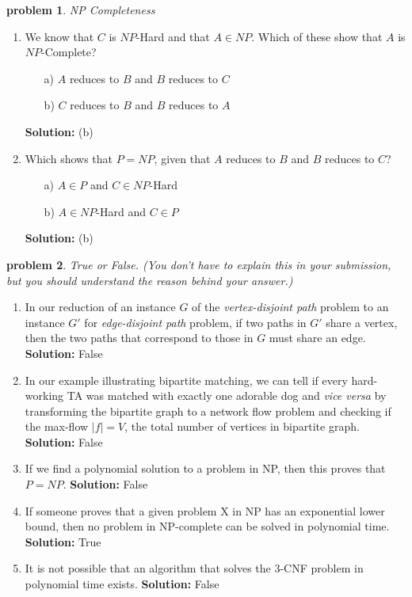 \documentclass[10pt]{article}
\newcommand{\solution}[1]{\color{blue}\hfill\break\noindent\textbf{Solution:} #1\color{black}}
\newtheorem{problem}{\sc\color{cit}problem}
\begin{document}
\begin{problem}NP Completeness\end{problem}
\begin{enumerate}
    \item We know that $C$ is $NP$-Hard and that $A \in NP$.  Which of these show that $A$ is $NP$-Complete?
    \begin{itemize}
        \item[a)] $A$ reduces to $B$ and $B$ reduces to $C$
        \item[b)] $C$ reduces to $B$ and $B$ reduces to $A$
    \end{itemize}
    \solution{
    (b)
    }

    
    \item Which shows that $P = NP$, given that $A$ reduces to $B$ and $B$ reduces to $C$?
    \begin{itemize}
        \item[a)] $A \in P$ and $C \in NP$-Hard
        \item[b)] $A \in NP$-Hard and $C \in P$
    \end{itemize}
    \solution{
    (b)
    }

\end{enumerate}


\begin{problem} True or False. (You don't have to explain this in your submission, but you should understand the reason behind your answer.)  \end{problem}

\begin{enumerate}
\renewcommand{\theenumi}{\Alph{enumi}}

\item In our reduction of an instance $G$ of the \emph{vertex-disjoint path} problem to an instance $G'$ for \emph{edge-disjoint path} problem, if two paths in $G'$ share a vertex, then the two paths that correspond to those in $G$ must share an edge.
\solution{
False
}

\item In our example illustrating bipartite matching, we can tell if every hard-working TA was matched with exactly one adorable dog and \textit{vice versa} by transforming the bipartite graph to a network flow problem and checking if the max-flow $|f| = V$, the total number of vertices in bipartite graph.
\solution{
False
}

\item If we find a polynomial solution to a problem in NP, then this proves that $P=NP$.
\solution{
False
}

\item If someone proves that a given problem X in NP has an exponential lower bound, then no problem in NP-complete can be solved in polynomial time. 
\solution{
True
}

\item It is not possible that an algorithm that solves the 3-CNF problem in polynomial time exists.
\solution{
False
}

\end{enumerate}
\end{document}
